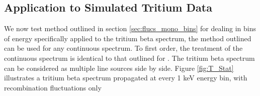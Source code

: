    %


\newpage

\subsection{Application to Simulated Tritium Data}

We now test method outlined in section \ref{sec:flucs_mono_bins} for dealing in bins of energy specifically applied to the tritium beta spectrum, the method outlined can be used for any continuous spectrum. To first order, the treatment of the continuous spectrum is identical to that outlined for \KrCal. The tritium beta spectrum can be considered as multiple line sources side by side. Figure \ref{fig:T_Stat} illustrates a tritium beta spectrum propagated at every 1 keV energy bin, with recombination fluctuations only

